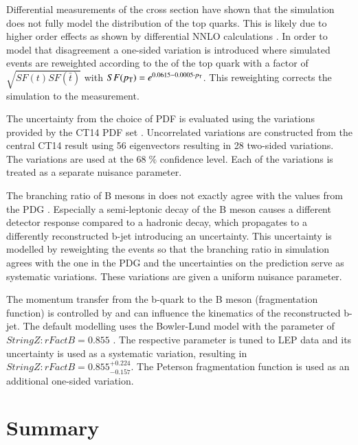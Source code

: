 Differential measurements of the \ttbar cross section \cite{CMS-PAS-TOP-16-011} have shown that the simulation does not fully model the \pt distribution of the top quarks.
This is likely due to higher order effects as shown by differential NNLO calculations \cite{PhysRevLett.116.082003}. In order to model that disagreement a one-sided variation is introduced where simulated events are reweighted according to the \pt of the top quark with a factor of $\sqrt{SF(t)SF(\bar{t})}$ with $SF(p_{\mathrm{T}})=e^{0.0615-0.0005\cdot p_{\mathrm{T}}}$.
This reweighting corrects the simulation to the measurement.

The uncertainty from the choice of PDF is evaluated using the variations provided by the CT14 PDF set \cite{Dulat:2015mca}. Uncorrelated variations are constructed from the central CT14 result using 56 eigenvectors resulting in 28 two-sided variations.
The variations are used at the $68 \;\%$ confidence level. Each of the variations is treated as a separate nuisance parameter.


The branching ratio of B mesons in \PYTHIA does not exactly agree with the values from the PDG  . Especially a semi-leptonic decay of the B meson causes a different detector response compared to a hadronic decay,
which propagates to a differently reconstructed b-jet introducing an uncertainty.
This uncertainty is modelled by reweighting the events so that the branching ratio in simulation agrees with the one in the PDG and the uncertainties on the prediction serve as systematic
variations. These variations are given a uniform nuisance parameter.

The momentum transfer from the b-quark to the B meson (fragmentation function) is controlled by \PYTHIA and can influence the kinematics of the reconstructed b-jet. 
The default modelling uses the Bowler-Lund model \cite{Bowler1981} with the parameter of $StringZ:rFactB = 0.855$ \cite{Skands:2014pea,CMS-PAS-TOP-16-021}.
The respective parameter is tuned to LEP data and its uncertainty is used as a systematic variation, resulting in $StringZ:rFactB = 0.855^{+0.224}_{-0.157}$.
The Peterson fragmentation function \cite{PhysRevD.27.105} is used as an additional one-sided variation. 

\section{Summary}

